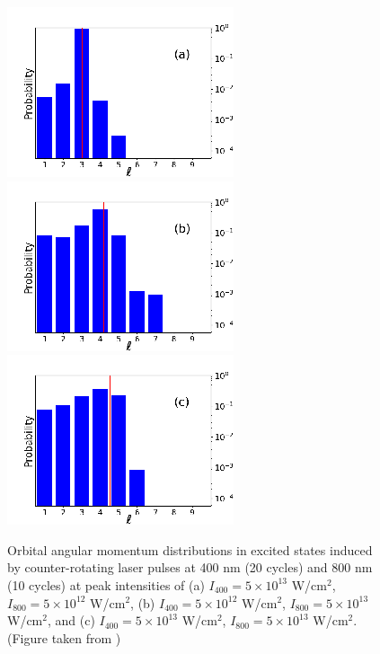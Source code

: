 \begin{figure}[!ht]
\centering
\includegraphics[width=0.32\columnwidth]{figs/Rydberg/Gebre-bicircular-Fig9a.png}
\includegraphics[width=0.32\columnwidth]{figs/Rydberg/Gebre-bicircular-Fig9b.png}
\includegraphics[width=0.32\columnwidth]{figs/Rydberg/Gebre-bicircular-Fig9c.png}
\caption{\label{fig:angular}
Orbital angular momentum distributions in excited states induced by counter-rotating laser pulses at 400 nm (20 cycles) and 800 nm (10 cycles) at peak intensities of (a) $I_{400} =  5 \times 10^{13}$ W/cm$^2$, $I_{800} = 5 \times 10^{12}$ W/cm$^2$, (b) $I_{400} = 5 \times 10^{12}$ W/cm$^2$, $I_{800} =  5 \times 10^{13}$ W/cm$^2$, and (c) $I_{400} = 5 \times 10^{13}$ W/cm$^2$, $I_{800} = 5 \times 10^{13}$ W/cm$^2$. (Figure taken from \cite{venzke2020_ryd})
}
\end{figure}


